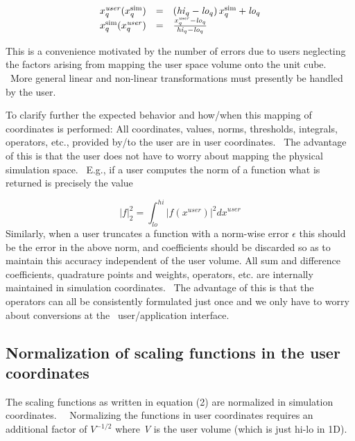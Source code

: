 \documentclass[letterpaper]{book}
\begin{document}
\bigskip

\begin{equation}
\begin{matrix}\hfill
x_{q}^{\mathrm{{\mathit{user}}}}(x_{q}^{\mathrm{{sim}}})&\text{=}&\left(\mathrm{{\mathit{hi}}}_{q}-\mathrm{{\mathit{lo}}}_{q}\right)x_{q}^{\mathrm{{sim}}}+\mathrm{{\mathit{lo}}}_{q}\hfill\null
\\\hfill
x_{q}^{\mathrm{{sim}}}(x_{q}^{\mathrm{{\mathit{user}}}})&\text{=}&\frac{x_{q}^{\mathrm{{\mathit{user}}}}-\mathrm{{\mathit{lo}}}_{q}}{\mathrm{{\mathit{hi}}}_{q}-\mathrm{{\mathit{lo}}}_{q}}\hfill\null
\end{matrix}
\end{equation}

\bigskip

This is a convenience motivated by the number of errors due to users neglecting the factors arising from mapping the
user space volume onto the unit cube. \ More general linear and non-linear transformations must presently be handled by
the user.

To clarify further the expected behavior and how/when this mapping of coordinates is performed: All coordinates, values,
norms, thresholds, integrals, operators, etc., provided by/to the user are in user coordinates. \ The advantage of this
is that the user does not have to worry about mapping the physical simulation space. \ E.g., if a user computes the
norm of a function what is returned is precisely the value

\begin{equation}
\left|f\right|_{2}^{2}=\int
_{\mathrm{{\mathit{lo}}}}^{\mathrm{{\mathit{hi}}}}\left|f(x^{\mathrm{{\mathit{user}}}})\right|^{2}\mathit{dx}^{\mathrm{{\mathit{user}}}}
\end{equation}
Similarly, when a user truncates a function with a norm-wise error  $\epsilon $ this should be the error in the above
norm, and coefficients should be discarded so as to maintain this accuracy independent of the user volume. All sum and
difference coefficients, quadrature points and weights, operators, etc. are internally maintained in simulation
coordinates. \ The advantage of this is that the operators can all be consistently formulated just once and we only
have to worry about conversions at the \ user/application interface.

\subsection[Normalization of scaling functions in the user coordinates]{Normalization of scaling functions in the user
coordinates}
The scaling functions as written in equation (2) are normalized in simulation coordinates. \ \ Normalizing the functions
in user coordinates requires an additional factor of  $V^{-1/2}$ where \textit{V }is the user volume (which is just
hi-lo in 1D).
\end{document}
